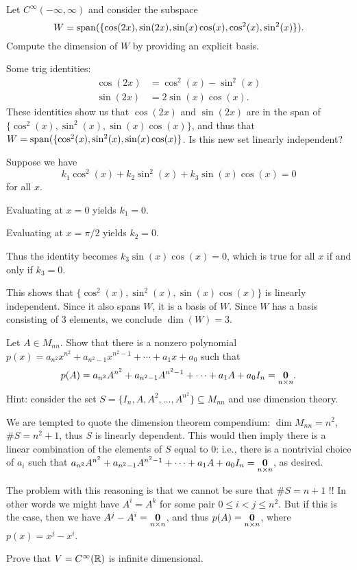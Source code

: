\ii Let $C^\infty(-\infty,\infty)$ and consider the subspace 
\[
W=\operatorname{span}(\{\cos(2x),\sin(2x), \sin(x)\cos(x), \cos^2(x),\sin^2(x) \}).
\]
Compute the dimension of $W$ by providing an explicit basis.
\\
\begin{solution}
Some trig identities:
\begin{align*}
\cos(2x)&=\cos^2(x)-\sin^2(x)\\
\sin(2x)&=2\sin(x)\cos(x).
\end{align*}
These identities show us that $\cos(2x)$ and $\sin(2x)$ are in the span of $\{\cos^2(x),\sin^2(x),\sin(x)\cos(x)\}$, and thus that $W=\operatorname{span}(\{\cos^2(x),\sin^2(x),\sin(x)\cos(x)\}$. Is this new set linearly independent? 

Suppose we have 
\[
k_1\cos^2(x)+k_2\sin^2(x)+k_3\sin(x)\cos(x)=0
\]
for all $x$. 

Evaluating at $x=0$ yields $k_1=0$. 

Evaluating at $x=\pi/2$ yields $k_2=0$. 

Thus the identity becomes $k_3\sin(x)\cos(x)=0$, which is true for all $x$ if and only if $k_3=0$. 

This shows that $\{\cos^2(x),\sin^2(x),\sin(x)\cos(x)\}$ is linearly independent. Since it also spans $W$, it is a basis of $W$. Since $W$ has a basis consisting of 3 elements, we conclude $\dim(W)=3$.
\end{solution}
\ii Let $A\in M_{nn}$. Show that there is a nonzero polynomial $p(x)=a_{n^2}x^{n^2}+a_{n^2-1}x^{n^2-1}+\cdots +a_1x+a_0$ such that 
\[
p(A)=a_{n^2}A^{n^2}+a_{n^2-1}A^{n^2-1}+\cdots +a_1A+a_0I_n=\underset{n\times n}{{\mathbf 0}}.
\]
Hint: consider the set $S=\{I_n, A, A^2, \dots, A^{n^2}\}\subseteq M_{nn}$ and use dimension theory. 
\\
\begin{solution}
We are tempted to quote the dimension theorem compendium: $\dim M_{nn}=n^2$, $\#S=n^2+1$, thus $S$ is linearly dependent. This would then imply there is a linear combination of the elements of $S$ equal to 0: i.e., there is a nontrivial choice of $a_i$ such that $a_{n^2}A^{n^2}+a_{n^2-1}A^{n^2-1}+\cdots +a_1A+a_0I_n=\underset{n\times n}{{\mathbf 0}}$, as desired. 

The problem with this reasoning is that we cannot be sure that $\#S=n+1$ !! In other words we might have $A^i=A^k$ for some pair $0\leq i<j\leq n^2$. But if this is the case, then we have $A^j-A^i=\underset{n\times n}{{\mathbf 0}}$, and thus $p(A)=\underset{n\times n}{{\mathbf 0}}$, where $p(x)=x^j-x^i$. 
\end{solution}
\ii Prove that $V=C^\infty({\mathbb R})$ is infinite dimensional. 

